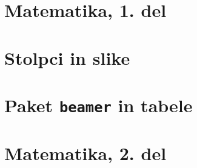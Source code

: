 \documentclass{beamer}
\begin{document}
\section[Matematika, 1. del\\\large{Analiza, logika, množice}]{Matematika, 1. del}




\section{Stolpci in slike}




\section{Paket \texttt{beamer} in tabele}


\section[Matematika, 2. del\\\large{Zaporedja, algebra, grupe}]{Matematika, 2. del}
\end{document}

